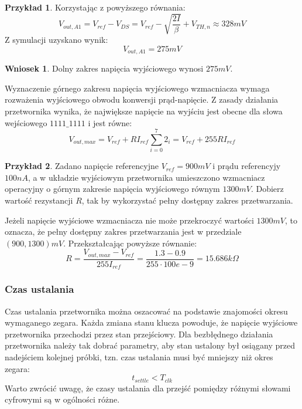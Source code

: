 \documentclass[10pt,a4paper,twoside]{report}
\theoremstyle{definition}
\theoremstyle{definition}
\theoremstyle{definition}
\newtheorem{przyklad}{Przykład}[section]
\theoremstyle{definition}
\theoremstyle{definition}
\newtheorem{wniosek}{Wniosek}[section]
\begin{document}
{{{{{\begin{przyklad}
	{Korzystając z powyższego równania:
		\begin{equation}
			V_{out,A1} = V_{ref} - V_{DS} = V_{ref} - \sqrt{\frac{2I}{\beta}} +V_{TH,n} \approx 328 mV
		\end{equation}
	Z symulacji uzyskano wynik:
		\begin{equation}
			V_{out,A1} = 275mV
		\end{equation}
	}
	\end{przyklad}
	\begin{wniosek}{Dolny zakres napięcia wyjściowego wynosi $275mV$.}
	\end{wniosek}
	
	{	Wyznaczenie górnego zakresu napięcia wyjściowego wzmacniacza wymaga rozważenia wyjściowego obwodu konwersji prąd-napięcie. Z zasady działania przetwornika wynika, że największe napięcie na wyjściu jest obecne dla słowa wejściowego $1111\_1111$ i jest równe:
	\begin{equation}
		V_{out,max} = V_{ref} + R I_{ref} \sum_{i=0}^{7} 2_i = V_{ref} + 255 R I_{ref} 
	\end{equation}
	\begin{przyklad}{Zadano napięcie referencyjne $V_{ref}=900mV$ i prądu referencyjy $100nA$, a w układzie wyjściowym przetwornika umieszczono wzmacniacz operacyjny o górnym zakresie napięcia wyjściowego równym $1300mV$. Dobierz wartość rezystancji $R$, tak by wykorzystać pełny dostępny zakres przetwarzania.}
		
	{ Jeżeli napięcie wyjściowe wzmacniacza nie może przekroczyć wartości $1300mV$, to oznacza, że pełny dostępny zakres przetwarzania jest w przedziale $(900,1300)mV$. Przekształcając powyższe równanie:
	\begin{equation}
		R = \frac{V_{out,max} -  V_{ref}}{255  I_{ref} } = \frac{1.3-0.9}{255 \cdot 100e-9} = 15.686k\Omega
	\end{equation}	
	}
	\end{przyklad}}
	\subsubsection{Czas ustalania}
	{	Czas ustalania przetwornika można oszacować na podstawie znajomości okresu wymaganego zegara. Każda zmiana stanu klucza powoduje, że napięcie wyjściowe przetwornika przechodzi przez stan przejściowy. Dla bezbłędnego działania przetwornika należy tak dobrać parametry, aby stan ustalony był osiągany przed nadejściem kolejnej próbki, tzn. czas ustalania musi być mniejszy niż okres zegara:
	\begin{equation}
		t_{settle} < T_{clk}
	\end{equation}
	Warto zwrócić uwagę, że czasy ustalania dla przejść pomiędzy różnymi słowami cyfrowymi są w ogólności różne.  
}}}}}}
\end{document}
